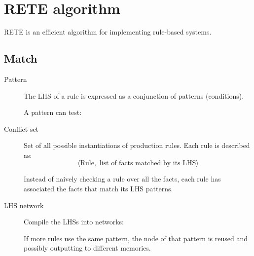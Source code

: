 \section{RETE algorithm}

RETE is an efficient algorithm for implementing rule-based systems.

\subsection{Match}
\begin{description}
    \item[Pattern] 
        The LHS of a rule is expressed as a conjunction of patterns (conditions).

        A pattern can test:

    \item[Conflict set] 
        Set of all possible instantiations of production rules.
        Each rule is described as:
        \[ \langle \text{Rule}, \text{ list of facts matched by its LHS} \rangle \]

        Instead of naively checking a rule over all the facts, each rule has associated the facts that match its LHS patterns.

    \item[LHS network]
        Compile the LHSs into networks:
        If more rules use the same pattern, the node of that pattern is reused and possibly outputting to different memories.
\end{description}


